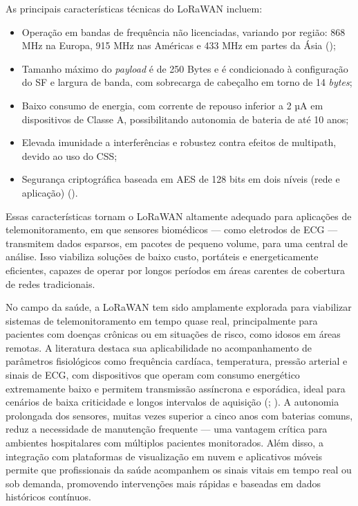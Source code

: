 As principais características técnicas do LoRaWAN incluem:

\begin{itemize}
    \item Operação em bandas de frequência não licenciadas, variando por região: 868 MHz na Europa, 915 MHz nas Américas e 433 MHz em partes da Ásia ();
    \item Tamanho máximo do \textit{payload} é de 250 Bytes e é condicionado à configuração do SF e largura de banda, com sobrecarga de cabeçalho em torno de 14 \textit{bytes};
    \item Baixo consumo de energia, com corrente de repouso inferior a 2 µA em dispositivos de Classe A, possibilitando autonomia de bateria de até 10 anos;
    \item Elevada imunidade a interferências e robustez contra efeitos de multipath, devido ao uso do CSS;
    \item Segurança criptográfica baseada em AES de 128 bits em dois níveis (rede e aplicação) ().
\end{itemize}



Essas características tornam o LoRaWAN altamente adequado para aplicações de telemonitoramento, em que sensores biomédicos — como eletrodos de ECG — transmitem dados esparsos, em pacotes de pequeno volume, para uma central de análise. Isso viabiliza soluções de baixo custo, portáteis e energeticamente eficientes, capazes de operar por longos períodos em áreas carentes de cobertura de redes tradicionais.


No campo da saúde, a LoRaWAN tem sido amplamente explorada para viabilizar sistemas de telemonitoramento em tempo quase real, principalmente para pacientes com doenças crônicas ou em situações de risco, como idosos em áreas remotas. A literatura destaca sua aplicabilidade no acompanhamento de parâmetros fisiológicos como frequência cardíaca, temperatura, pressão arterial e sinais de \acs{ECG}, com dispositivos que operam com consumo energético extremamente baixo e permitem transmissão assíncrona e esporádica, ideal para cenários de baixa criticidade e longos intervalos de aquisição (; ). A autonomia prolongada dos sensores, muitas vezes superior a cinco anos com baterias comuns, reduz a necessidade de manutenção frequente — uma vantagem crítica para ambientes hospitalares com múltiplos pacientes monitorados. Além disso, a integração com plataformas de visualização em nuvem e aplicativos móveis permite que profissionais da saúde acompanhem os sinais vitais em tempo real ou sob demanda, promovendo intervenções mais rápidas e baseadas em dados históricos contínuos.

